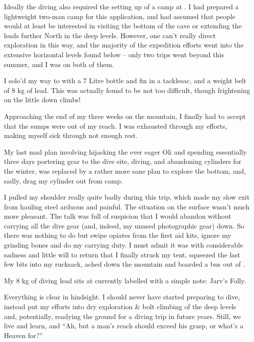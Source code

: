 Ideally the diving also required the setting up of a camp at . I
had prepared a lightweight two-man camp for this application, and had
assumed that people would at least be interested in visiting the bottom
of the cave or extending the leads further North in the deep levels.
However, one can't really direct exploration in this way, and the
majority of the expedition efforts went into the extensive horizontal
levels found below  -- only two trips went
beyond  this summer, and I was on both of them.

I solo'd my way to  with a 7 Litre bottle and fin in a
tacklesac, and a weight belt of 8 kg of lead. This was actually found to
be not too difficult, though frightening on the little down climbs!

Approaching the end of my three weeks on the mountain, I finally had to
accept that the sumps were out of my reach. I was exhausted through my
efforts, making myself sick through not enough rest.

My last mad plan involving hijacking the ever eager Oli and spending
essentially three days portering gear to the dive site, diving, and
abandoning cylinders for the winter, was replaced by a rather more sane
plan to explore the bottom, and, sadly, drag my cylinder out from camp.

I pulled my shoulder really quite badly during this trip, which made my
slow exit from  hauling steel arduous and painful. The
situation on the surface wasn't much more pleasant. The  talk was
full of suspicion that I would abandon without carrying all the dive
gear (and, indeed, my unused photographic gear) down. So there was
nothing to do but swipe opiates from the first aid kits, ignore my
grinding bones and do my carrying duty. I must admit it was with
considerable sadness and little will to return that I finally struck my
tent, squeezed the last few bits into my rucksack, ached down the
mountain and boarded a bus out of .

My 8 kg of diving lead sits at  currently labelled with a
simple note: Jarv's Folly.

Everything is clear in hindsight. I should never have started preparing
to dive, instead put my efforts into dry exploration \& bolt climbing of
the deep levels and, potentially, readying the ground for a diving trip
in future years. Still, we live and learn, and ``Ah, but a man's reach
should exceed his grasp, or what's a Heaven for?''


